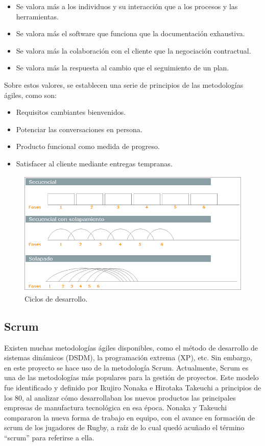 \begin{itemize}
\item Se valora más a los individuos y su interacción que a los procesos y las herramientas.
\item Se valora más el software que funciona que la documentación exhaustiva.
\item Se valora más la colaboración con el cliente que la negociación contractual.
\item Se valora más la respuesta al cambio que el seguimiento de un plan.
\end{itemize}

\noindent
Sobre estos valores, se establecen una serie de principios de las metodologías ágiles, como son:

\begin{itemize}
\item Requisitos cambiantes bienvenidos.
\item Potenciar las conversaciones en persona.
\item Producto funcional como medida de progreso.
\item Satisfacer al cliente mediante entregas tempranas.
\end{itemize}

\begin{figure}[t!]
\centering
\includegraphics[width=12cm,height=6cm]{figuras/ciclos_desarrollo.png}
\caption{Ciclos de desarrollo.}
\label{fig:ciclos}
\end{figure}

\subsection{Scrum} \label{scrum}
Existen muchas metodologías ágiles disponibles, como el método de desarrollo de sistemas dinámicos (DSDM), la programación extrema (XP), etc. Sin embargo, en este proyecto se hace uso de la metodología Scrum. Actualmente, Scrum es una de las metodologías más populares para la gestión de proyectos. Este modelo fue identificado y definido por Ikujiro Nonaka e Hirotaka Takeuchi a principios de los 80, al analizar cómo desarrollaban los nuevos productos las principales empresas de manufactura tecnológica en esa época. Nonaka y Takeuchi compararon la nueva forma de trabajo en equipo, con el avance en formación de scrum de los jugadores de Rugby, a raíz de lo cual quedó acuñado el término “scrum” para referirse a ella.

